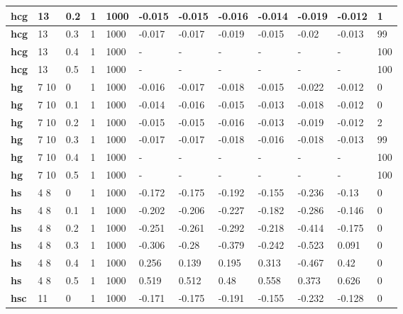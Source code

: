 \begin{longtable}[h]{|p{0.8cm}|p{1.5cm}|p{1cm}|p{1cm}|p{1cm}|p{1cm}|p{1cm}|p{1cm}|p{1cm}|p{1cm}|p{1cm}|p{1.5cm}|}
    \\ \hline
  \textbf{hcg } &  13         & 0.2 & 1 & 1000 & -0.015 & -0.015 & -0.016 & -0.014 & -0.019 & -0.012 &   1
    \\ \hline
  \textbf{hcg } &  13         & 0.3 & 1 & 1000 & -0.017 & -0.017 & -0.019 & -0.015 &  -0.02 & -0.013 &  99
    \\ \hline
  \textbf{hcg } &  13         & 0.4 & 1 & 1000 & - & - & - & - & - & - & 100
    \\ \hline
  \textbf{hcg } &  13         & 0.5 & 1 & 1000 & - & - & - & - & - & - & 100
    \\ \hline
  \textbf{hg  } &  7 10       &   0 & 1 & 1000 & -0.016 & -0.017 & -0.018 & -0.015 & -0.022 & -0.012 &   0
    \\ \hline
  \textbf{hg  } &  7 10       & 0.1 & 1 & 1000 & -0.014 & -0.016 & -0.015 & -0.013 & -0.018 & -0.012 &   0
    \\ \hline
  \textbf{hg  } &  7 10       & 0.2 & 1 & 1000 & -0.015 & -0.015 & -0.016 & -0.013 & -0.019 & -0.012 &   2
    \\ \hline
  \textbf{hg  } &  7 10       & 0.3 & 1 & 1000 & -0.017 & -0.017 & -0.018 & -0.016 & -0.018 & -0.013 &  99
    \\ \hline
  \textbf{hg  } &  7 10       & 0.4 & 1 & 1000 & - & - & - & - & - & - & 100
    \\ \hline
  \textbf{hg  } &  7 10       & 0.5 & 1 & 1000 & - & - & - & - & - & - & 100
    \\ \hline
  \textbf{hs  } &  4 8        &   0 & 1 & 1000 & -0.172 & -0.175 & -0.192 & -0.155 & -0.236 &  -0.13 &   0
    \\ \hline
  \textbf{hs  } &  4 8        & 0.1 & 1 & 1000 & -0.202 & -0.206 & -0.227 & -0.182 & -0.286 & -0.146 &   0
    \\ \hline
  \textbf{hs  } &  4 8        & 0.2 & 1 & 1000 & -0.251 & -0.261 & -0.292 & -0.218 & -0.414 & -0.175 &   0
    \\ \hline
  \textbf{hs  } &  4 8        & 0.3 & 1 & 1000 & -0.306 &  -0.28 & -0.379 & -0.242 & -0.523 &  0.091 &   0
    \\ \hline
  \textbf{hs  } &  4 8        & 0.4 & 1 & 1000 &  0.256 &  0.139 &  0.195 &  0.313 & -0.467 &   0.42 &   0
    \\ \hline
  \textbf{hs  } &  4 8        & 0.5 & 1 & 1000 &  0.519 &  0.512 &   0.48 &  0.558 &  0.373 &  0.626 &   0
    \\ \hline
  \textbf{hsc } &  11         &   0 & 1 & 1000 & -0.171 & -0.175 & -0.191 & -0.155 & -0.232 & -0.128 &   0

\end{longtable}
